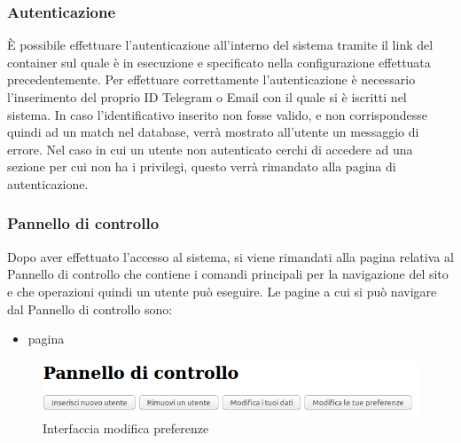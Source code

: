 \subsubsection{Autenticazione}
È possibile effettuare l'autenticazione all'interno del sistema tramite il link del container sul quale è in esecuzione e specificato nella configurazione effettuata precedentemente.
Per effettuare correttamente l'autenticazione è necessario l'inserimento del proprio ID Telegram o Email con il quale si è iscritti nel sistema.
In caso l'identificativo inserito non fosse valido, e non corrispondesse quindi ad un match nel database, verrà mostrato all'utente un messaggio di errore.
Nel caso in cui un utente non autenticato cerchi di accedere ad una sezione per cui non ha i privilegi, questo verrà rimandato alla pagina di autenticazione.

\subsubsection{Pannello di controllo}
Dopo aver effettuato l'accesso al sistema, si viene rimandati alla pagina relativa al Pannello di controllo che contiene i comandi principali per la navigazione del sito e che operazioni quindi un utente può eseguire.
Le pagine a cui si può navigare dal Pannello di controllo sono:
\begin{itemize}
	\item pagina
\end{itemize}
\begin{figure}[H]
	\centering
	\includegraphics[width=14cm]{img/pannello_1.png} %
	\caption{Interfaccia modifica preferenze}
\end{figure}

